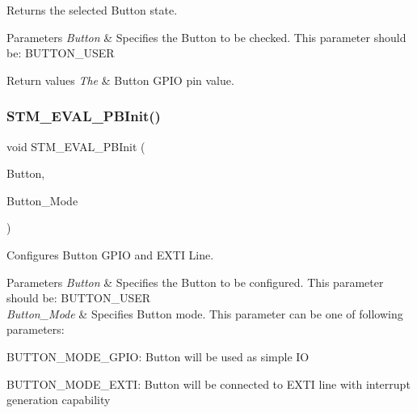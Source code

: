 Returns the selected Button state. 


\begin{DoxyParams}{Parameters}
{\em Button} & Specifies the Button to be checked. This parameter should be\+: B\+U\+T\+T\+O\+N\+\_\+\+U\+S\+ER\\
\hline
\end{DoxyParams}

\begin{DoxyRetVals}{Return values}
{\em The} & Button G\+P\+IO pin value. \\
\hline
\end{DoxyRetVals}
\mbox{\label{group___s_t_m32_f1_x_x___n_u_c_l_e_o___l_o_w___l_e_v_e_l___exported___functions_ga1cdc19fe328ddcd17bf50fcb62d78369}} 
\subsubsection{\texorpdfstring{STM\_EVAL\_PBInit()}{STM\_EVAL\_PBInit()}}
{\footnotesize\ttfamily void S\+T\+M\+\_\+\+E\+V\+A\+L\+\_\+\+P\+B\+Init (\begin{DoxyParamCaption}\item[{\mbox{\hyperlink{group___s_t_m32_f1_x_x___n_u_c_l_e_o___l_o_w___l_e_v_e_l___exported___types_ga643816dfbad5c734fc25a29ce8d35bb1}{Button\+\_\+\+Type\+Def}}}]{Button,  }\item[{\mbox{\hyperlink{group___s_t_m32_f1_x_x___n_u_c_l_e_o___l_o_w___l_e_v_e_l___exported___types_ga48825b7c7d851c440ef8e808fd9d8f0a}{Button\+Mode\+\_\+\+Type\+Def}}}]{Button\+\_\+\+Mode }\end{DoxyParamCaption})}



Configures Button G\+P\+IO and E\+X\+TI Line. 


\begin{DoxyParams}{Parameters}
{\em Button} & Specifies the Button to be configured. This parameter should be\+: B\+U\+T\+T\+O\+N\+\_\+\+U\+S\+ER \\
\hline
{\em Button\+\_\+\+Mode} & Specifies Button mode. This parameter can be one of following parameters\+:\\
\hline
\end{DoxyParams}
\begin{DoxyItemize}
\item B\+U\+T\+T\+O\+N\+\_\+\+M\+O\+D\+E\+\_\+\+G\+P\+IO\+: Button will be used as simple IO \item B\+U\+T\+T\+O\+N\+\_\+\+M\+O\+D\+E\+\_\+\+E\+X\+TI\+: Button will be connected to E\+X\+TI line with interrupt generation capability\end{DoxyItemize}

